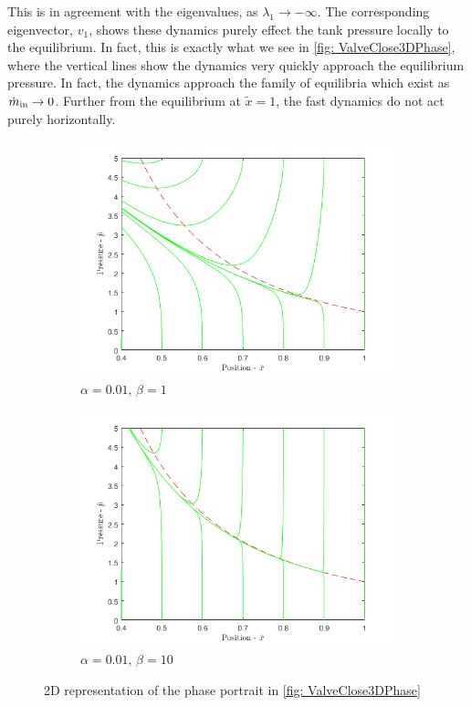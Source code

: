 This is in agreement with the eigenvalues, as $\lambda_1 \rightarrow - \infty$. The corresponding eigenvector, $v_1$, shows these dynamics purely effect the tank pressure locally to the equilibrium. In fact, this is exactly what we see in \cref{fig: ValveClose3DPhase}, where the vertical lines show the dynamics very quickly approach the equilibrium pressure. In fact, the dynamics approach the family of equilibria which exist as $\dot{m}_{\rm{in}} \rightarrow 0$. Further from the equilibrium at $\tilde{x} = 1$, the fast dynamics do not act purely horizontally.
~
% 
\begin{figure}[ht]
    \centering
    \begin{subfigure}{0.49\textwidth}
    \includegraphics[width=\textwidth]{Figures/LowFlow/PhasePortrait-b=1.png}
    \caption{$\alpha = 0.01, \, \beta = 1$}
    \label{fig: ValveClosePhase1}
    \end{subfigure}
    \begin{subfigure}{0.49\textwidth}
    \includegraphics[width=\textwidth]{Figures/LowFlow/PhasePortrait-b=10.png}
    \caption{$\alpha = 0.01, \, \beta = 10$}
    \label{fig: ValveClosePhase10}
    \end{subfigure}
    \caption{2D representation of the phase portrait in \cref{fig: ValveClose3DPhase}}    \label{fig: ValveClosePhase}
\end{figure}

